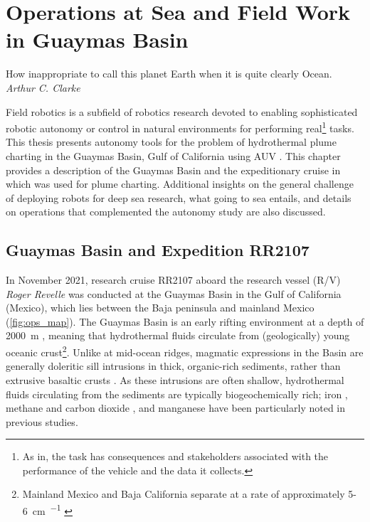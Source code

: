 \chapter{Operations at Sea and Field Work in Guaymas Basin}
\label{chap:opsatsea}

\begin{center}
    \begin{minipage}{0.6\textwidth}
      \begin{small}
        How inappropriate to call this planet Earth when it is quite clearly Ocean.\\ \emph{Arthur C. Clarke}
      \end{small}
    \end{minipage}
    \vspace{0.5cm}
\end{center}

Field robotics is a subfield of robotics research devoted to enabling sophisticated robotic autonomy or control in natural environments for performing real\footnote{As in, the task has consequences and stakeholders associated with the performance of the vehicle and the data it collects.} tasks.
This thesis presents autonomy tools for the problem of hydrothermal plume charting in the Guaymas Basin, Gulf of California using AUV \Sentry. 
This chapter provides a description of the Guaymas Basin and the expeditionary cruise in which \Sentry was used for plume charting.
Additional insights on the general challenge of deploying robots for deep sea research, what going to sea entails, and details on operations that complemented the autonomy study are also discussed. 

\section{Guaymas Basin and Expedition RR2107}
\label{sec:guaymas_description}
In November 2021, research cruise RR2107 aboard the research vessel (R/V) \emph{Roger Revelle} was conducted at the Guaymas Basin in the Gulf of California (Mexico), which lies between the Baja peninsula and mainland Mexico (\cref{fig:ops_map}).
The Guaymas Basin is an early rifting environment at a depth of \SI{2000}{\meter} \autocite{scholz2019shelf,moore1982geologic,teske2016guaymas}, meaning that hydrothermal fluids circulate from (geologically) young oceanic crust\footnote{Mainland Mexico and Baja California separate at a rate of approximately 5-\SI{6}{\cm\per\year} \autocite{lonsdale1985hydrothermal}}.
Unlike at mid-ocean ridges, magmatic expressions in the Basin are generally doleritic sill intrusions in thick, organic-rich sediments, rather than extrusive basaltic crusts \autocite{lonsdale1985hydrothermal,teske2019characteristics}.
As these intrusions are often shallow, hydrothermal fluids circulating from the sediments are typically biogeochemically rich; iron \autocite{scholz2019shelf}, methane and carbon dioxide \autocite{geilert2018formation}, and manganese \autocite{campbell1988manganese} have been particularly noted in previous studies.


